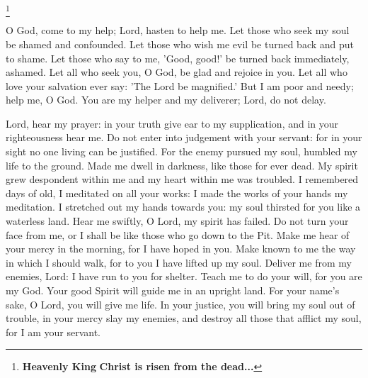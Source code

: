 \deletechar\throughtheprayers

\heavenlyking
\footnote{ \textbf{Heavenly King} \textbf{Christ is risen from the dead...} }


\trisagion\rest

\comeletusworship


\psalmfifty


O God, come to my help; Lord, hasten to help me. Let those who seek my soul be shamed and confounded.
Let those who wish me evil be turned back and put to shame.
Let those who say to me, 'Good, good!' be turned back immediately, ashamed.
Let all who seek you, O God, be glad and rejoice in you.
Let all who love your salvation ever say: 'The Lord be magnified.'
But I am poor and needy; help me, O God. You are my helper and my deliverer; Lord, do not delay.


Lord, hear my prayer: in your truth give ear to my supplication, and in your righteousness hear me.
Do not enter into judgement with your servant: for in your sight no one living can be justified.
For the enemy pursued my soul, humbled my life to the ground.
Made me dwell in darkness, like those for ever dead.
My spirit grew despondent within me and my heart within me was troubled.
I remembered days of old, I meditated on all your works: I made the works of your hands my meditation.
I stretched out my hands towards you: my soul thirsted for you like a waterless land.
Hear me swiftly, O Lord, my spirit has failed.
Do not turn your face from me, or I shall be like those who go down to the Pit.
Make me hear of your mercy in the morning, for I have hoped in you.
Make known to me the way in which I should walk, for to you I have lifted up my soul.
Deliver me from my enemies, Lord: I have run to you for shelter.
Teach me to do your will, for you are my God.
Your good Spirit will guide me in an upright land.
For your name's sake, O Lord, you will give me life.
In your justice, you will bring my soul out of trouble, in your mercy slay my enemies,
and destroy all those that afflict my soul, for I am your servant.



